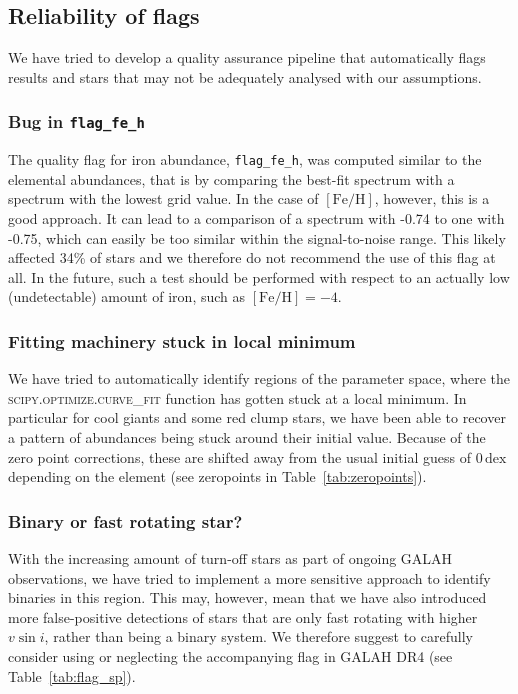 \documentclass[
  journal=pasa,
  manuscript=research-paper, %
  year=2023,
  volume=37
]{cup-journal}
\newcommand{\feh}{$\mathrm{[Fe/H]}$\xspace}
\newcommand{\vsini}{$v \sin i$\xspace}
\begin{document}
\subsection{Reliability of flags} \label{sec:caveats_flags}

We have tried to develop a quality assurance pipeline that automatically flags results and stars that may not be adequately analysed with our assumptions.

\subsubsection{Bug in \texttt{flag\_fe\_h}}

The quality flag for iron abundance, \texttt{flag\_fe\_h}, was computed similar to the elemental abundances, that is by comparing the best-fit spectrum with a spectrum with the lowest grid value. In the case of \feh, however, this is a good approach. It can lead to a comparison of a spectrum with -0.74 to one with -0.75, which can easily be too similar within the signal-to-noise range. This likely affected 34\% of stars and we therefore do not recommend the use of this flag at all. In the future, such a test should be performed with respect to an actually low (undetectable) amount of iron, such as $\mathrm{[Fe/H]} = -4$.

\subsubsection{Fitting machinery stuck in local minimum}

We have tried to automatically identify regions of the parameter space, where the \textsc{scipy.optimize.curve\_fit} function has gotten stuck at a local minimum. In particular for cool giants and some red clump stars, we have been able to recover a pattern of abundances being stuck around their initial value. Because of the zero point corrections, these are shifted away from the usual initial guess of $0\,\mathrm{dex}$ depending on the element (see zeropoints in Table~\ref{tab:zeropoints}).

\subsubsection{Binary or fast rotating star?}

With the increasing amount of turn-off stars as part of ongoing GALAH observations, we have tried to implement a more sensitive approach to identify binaries in this region. This may, however, mean that we have also introduced more false-positive detections of stars that are only fast rotating with higher \vsini, rather than being a binary system. We therefore suggest to carefully consider using or neglecting the accompanying flag in GALAH DR4 (see Table~\ref{tab:flag_sp}).
\end{document}

